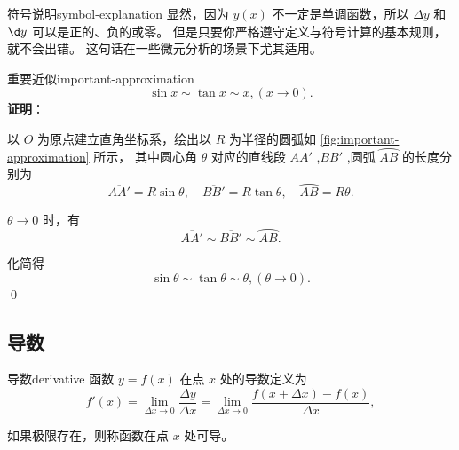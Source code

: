 \begin{note}{符号说明}{symbol-explanation}
    显然，因为 $ y(x) $ 不一定是单调函数，所以 $ \Delta y $ 和 $ \d y $ 可以是正的、负的或零。
    但是只要你严格遵守定义与符号计算的基本规则，就不会出错。
    这句话在一些微元分析的场景下尤其适用。
\end{note}

\begin{example}{重要近似}{important-approximation}
    \begin{equation}
        \sin x \sim \tan x \sim x, (x \to 0).
    \end{equation}
    \textbf{证明}：


    以 $ O $ 为原点建立直角坐标系，绘出以 $ R $ 为半径的圆弧如 \cref{fig:important-approximation} 所示，
    其中圆心角 $ \theta $ 对应的直线段 $ AA' $ ,$ BB' $ ,圆弧 $ \overparen{AB} $ 的长度分别为
    \begin{equation*}
        \overline{AA'} = R \sin \theta, \quad \overline{BB'} = R \tan \theta, \quad \overparen{AB} = R \theta.
    \end{equation*}

    $\theta \to 0$ 时，有
    \begin{equation*}
        \overline{AA'} \sim \overline{BB'} \sim \overparen{AB} .
    \end{equation*}

    化简得
    \begin{equation*}
        \sin \theta \sim \tan \theta \sim \theta, (\theta \to 0).
    \end{equation*}
    \qed
\end{example}

\subsection{导数}\label{subsec:derivative}

\begin{definition}{导数}{derivative}
    函数 $ y = f(x) $ 在点 $ x $ 处的导数定义为
    \begin{equation}
        f'(x) = \lim_{\Delta x \to 0} \frac{\Delta y}{\Delta x} = \lim_{\Delta x \to 0} \frac{f(x + \Delta x) - f(x)}{\Delta x},
    \end{equation}

    如果极限存在，则称函数在点 $ x $ 处可导。

\end{definition}

